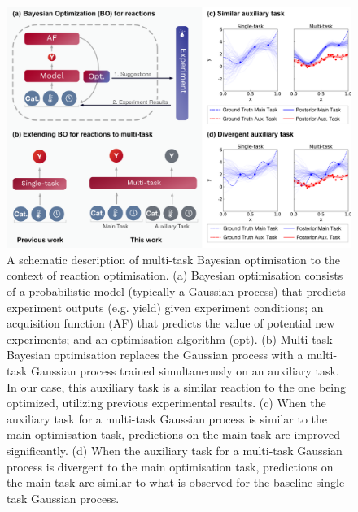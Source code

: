 \begin{figure}
    \centering
    \includegraphics[width=1.2\textwidth]{gfx/Chapter04/paper_figure_1.png}
    \caption{A schematic description of multi-task Bayesian optimisation to the context of reaction optimisation. (a) Bayesian optimisation consists of a probabilistic model (typically a Gaussian process) that predicts experiment outputs (e.g. yield) given experiment conditions; an acquisition function (AF) that predicts the value of potential new experiments; and an optimisation algorithm (opt). (b) Multi-task Bayesian optimisation replaces the Gaussian process with a multi-task Gaussian process trained simultaneously on an auxiliary task. In our case, this auxiliary task is a similar reaction to the one being optimized, utilizing previous experimental results. (c) When the auxiliary task for a multi-task Gaussian process is similar to the main optimisation task, predictions on the main task are improved significantly. (d) When the auxiliary task for a multi-task Gaussian process is divergent to the main optimisation task, predictions on the main task are similar to what is observed for the baseline single-task Gaussian process.}
    \label{fig:multitask_overview}
\end{figure}

